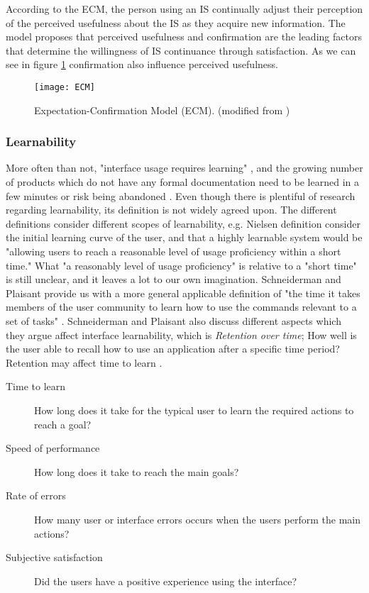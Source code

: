 According to the ECM, the person using an IS continually adjust their perception of the perceived usefulness about the IS as they acquire new information. The model proposes that perceived usefulness and confirmation are the leading factors that determine the willingness of IS continuance through satisfaction. As we can see in figure \ref{fig:ECM} confirmation also influence perceived usefulness.

\begin{figure}[h]
  \centering
    \texttt{[image: ECM]}
  \caption{Expectation-Confirmation Model (ECM). (modified from \cite{Bhattacherjee2001a})}
  \label{fig:ECM}
\end{figure}

\subsubsection{Learnability}
More often than not, "interface usage requires learning" \cite{Grossman2009}, and the growing number of  products which do not have any formal documentation need to be learned in a few minutes or risk being abandoned \cite{Bergman2000}. Even though there is plentiful of research regarding learnability, its definition is not widely agreed upon. The different definitions consider different scopes of learnability, e.g. Nielsen definition consider the initial learning curve of the user, and that a highly learnable system would be "allowing users to reach a reasonable level of usage proficiency within a short time." What "a reasonably level of usage proficiency" is relative to a "short time" is still unclear, and it leaves a lot to our own imagination. Schneiderman and Plaisant provide us with a more general applicable definition of "the time it takes members of the user community to learn how to use the commands relevant to a set of tasks" \cite{Shneiderman2004}. Schneiderman and Plaisant also discuss different aspects which they argue affect interface learnability, which is \textit{Retention over time}; How well is the user able to recall how to use an application after a specific time period? Retention may affect time to learn \cite{Shneiderman2004}.

\begin{description}
  \item[Time to learn] How long does it take for the typical user to learn the required actions to reach a goal?
  \item[Speed of performance] How long does it take to reach the main goals?
  \item[Rate of errors] How many user or interface errors occurs when the users perform the main actions?
  \item[Subjective satisfaction] Did the users have a positive experience using the interface?
\end{description}

